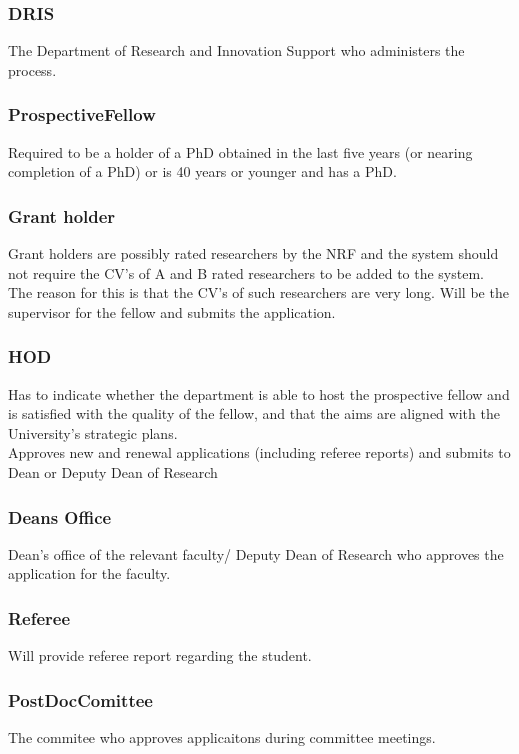 \documentclass[12pt]{article}
\begin{document}
\subsubsection{DRIS}
The Department of Research and Innovation Support who administers the process.

\subsubsection{ProspectiveFellow}
Required to be a holder of a PhD obtained in the last five years (or nearing completion of a PhD) or is 40 years or younger and has a PhD.

\subsubsection{Grant holder}
Grant holders are possibly rated researchers by the NRF and the system should not require the CV's of A and B rated researchers to be added to the system. The reason for this is that the CV's of such researchers are very long. Will be the supervisor for the fellow and submits the application.

\subsubsection{HOD}
Has to indicate whether the department  is able to host the prospective fellow and is satisfied with the quality of the fellow, and that the aims are aligned with the University’s strategic plans.\\

Approves new and renewal applications (including referee reports) and submits to Dean or Deputy Dean of Research

\subsubsection{Deans Office}
Dean's office of the relevant faculty/ Deputy Dean of Research who approves the application for the faculty.

\subsubsection{Referee}
Will provide referee report regarding the student.

\subsubsection{PostDocComittee}
The commitee who approves applicaitons during committee meetings.
\end{document}
